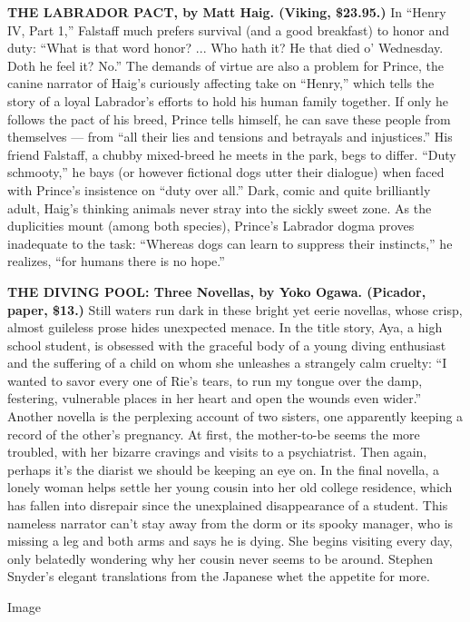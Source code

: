 \textbf{THE LABRADOR PACT, by Matt Haig. (Viking, \$23.95.)} In ``Henry
IV, Part 1,'' Falstaff much prefers survival (and a good breakfast) to
honor and duty: ``What is that word honor? ... Who hath it? He that died
o' Wednesday. Doth he feel it? No.'' The demands of virtue are also a
problem for Prince, the canine narrator of Haig's curiously affecting
take on ``Henry,'' which tells the story of a loyal Labrador's efforts
to hold his human family together. If only he follows the pact of his
breed, Prince tells himself, he can save these people from themselves
--- from ``all their lies and tensions and betrayals and injustices.''
His friend Falstaff, a chubby mixed-breed he meets in the park, begs to
differ. ``Duty schmooty,'' he bays (or however fictional dogs utter
their dialogue) when faced with Prince's insistence on ``duty over
all.'' Dark, comic and quite brilliantly adult, Haig's thinking animals
never stray into the sickly sweet zone. As the duplicities mount (among
both species), Prince's Labrador dogma proves inadequate to the task:
``Whereas dogs can learn to suppress their instincts,'' he realizes,
``for humans there is no hope.''

\textbf{THE DIVING POOL: Three Novellas, by Yoko Ogawa. (Picador, paper,
\$13.)} Still waters run dark in these bright yet eerie novellas, whose
crisp, almost guileless prose hides unexpected menace. In the title
story, Aya, a high school student, is obsessed with the graceful body of
a young diving enthusiast and the suffering of a child on whom she
unleashes a strangely calm cruelty: ``I wanted to savor every one of
Rie's tears, to run my tongue over the damp, festering, vulnerable
places in her heart and open the wounds even wider.'' Another novella is
the perplexing account of two sisters, one apparently keeping a record
of the other's pregnancy. At first, the mother-to-be seems the more
troubled, with her bizarre cravings and visits to a psychiatrist. Then
again, perhaps it's the diarist we should be keeping an eye on. In the
final novella, a lonely woman helps settle her young cousin into her old
college residence, which has fallen into disrepair since the unexplained
disappearance of a student. This nameless narrator can't stay away from
the dorm or its spooky manager, who is missing a leg and both arms and
says he is dying. She begins visiting every day, only belatedly
wondering why her cousin never seems to be around. Stephen Snyder's
elegant translations from the Japanese whet the appetite for more.

Image

